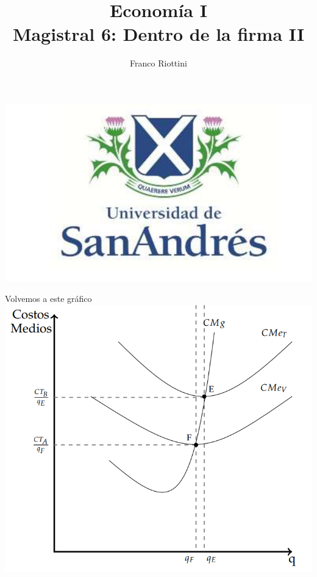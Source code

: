 \documentclass{beamer}
\title[Economía I]{Economía I \vspace{4mm}
\\ Magistral 6: Dentro de la firma II}
\date{}
\author[Riottini]{Franco Riottini}
\institute[]{Universidad de San Andrés}
\begin{document}
\begin{frame}
\titlepage
\centering
\includegraphics[scale=0.2]{../Figures/logoUDESA.jpg} 
\end{frame}


\begin{frame}{Volvemos a este gráfico}
    \centering
    \includegraphics[scale=0.5]{../Figures/C13.8b.png} 
\end{frame}
\end{document}
